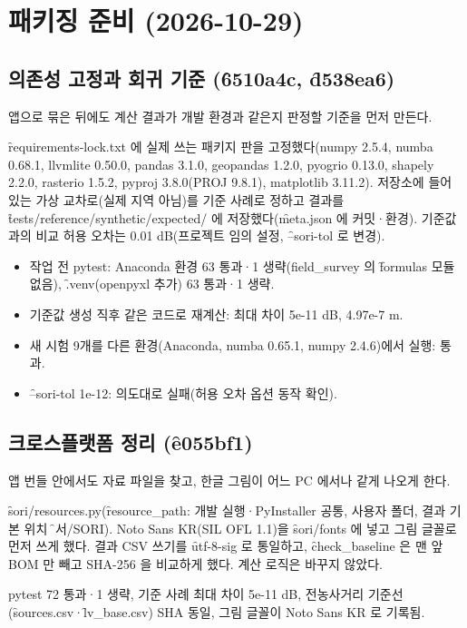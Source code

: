 \documentclass[10.5pt,a4paper]{article}
\begin{document}
\section{패키징 준비 (2026-10-29)}

\subsection{의존성 고정과 회귀 기준 (\f{6510a4c}, \f{d538ea6})}
 앱으로 묶은 뒤에도 계산 결과가 개발 환경과 같은지 판정할 기준을 먼저 만든다.

 \f{requirements-lock.txt} 에 실제 쓰는 패키지 판을 고정했다(numpy 2.5.4, numba 0.68.1, llvmlite 0.50.0, pandas 3.1.0, geopandas 1.2.0, pyogrio 0.13.0, shapely 2.2.0, rasterio 1.5.2, pyproj 3.8.0(PROJ 9.8.1), matplotlib 3.11.2). 저장소에 들어 있는 가상 교차로(실제 지역 아님)를 기준 사례로 정하고 결과를 \f{tests/reference/synthetic/expected/} 에 저장했다(\f{meta.json} 에 커밋·환경). 기준값과의 비교 허용 오차는 0.01 dB(프로젝트 임의 설정, \f{--sori-tol} 로 변경).

\begin{itemize}
\item 작업 전 pytest: Anaconda 환경 63 통과·1 생략(field\_survey 의 \f{formulas} 모듈 없음), \f{.venv}(openpyxl 추가) 63 통과·1 생략.
\item 기준값 생성 직후 같은 코드로 재계산: 최대 차이 5e-11 dB, 4.97e-7 m.
\item 새 시험 9개를 다른 환경(Anaconda, numba 0.65.1, numpy 2.4.6)에서 실행: 통과.
\item \f{--sori-tol 1e-12}: 의도대로 실패(허용 오차 옵션 동작 확인).
\end{itemize}

\subsection{크로스플랫폼 정리 (\f{e055bf1})}
 앱 번들 안에서도 자료 파일을 찾고, 한글 그림이 어느 PC 에서나 같게 나오게 한다.

 \f{sori/resources.py}(\f{resource\_path}: 개발 실행·PyInstaller 공통, 사용자 폴더, 결과 기본 위치 \f{문서/SORI}). Noto Sans KR(SIL OFL 1.1)을 \f{sori/fonts} 에 넣고 그림 글꼴로 먼저 쓰게 했다. 결과 CSV 쓰기를 \f{utf-8-sig} 로 통일하고, \f{check\_baseline} 은 맨 앞 BOM 만 빼고 SHA-256 을 비교하게 했다. 계산 로직은 바꾸지 않았다.

 pytest 72 통과·1 생략, 기준 사례 최대 차이 5e-11 dB, 전농사거리 기준선(\f{sources.csv}·\f{lv\_base.csv}) SHA 동일, 그림 글꼴이 Noto Sans KR 로 기록됨.
\end{document}
